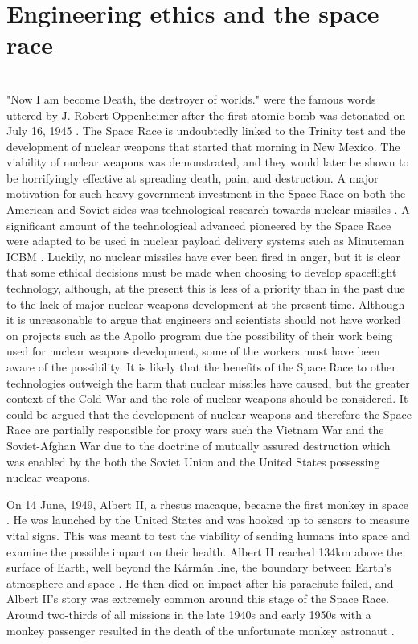 \documentclass[10pt, journal]{IEEEtran}
\begin{document}
\section{Engineering ethics and the space race}
~\\
"Now I am become Death, the destroyer of worlds." were the famous words uttered by J. Robert Oppenheimer after the first atomic bomb was detonated on July 16, 1945 \cite{oppenheimerQuote}. The Space Race is undoubtedly linked to the Trinity test and the development of nuclear weapons that started that morning in New Mexico. The viability of nuclear weapons was demonstrated, and they would later be shown to be horrifyingly effective at spreading death, pain, and destruction. A major motivation for such heavy government investment in the Space Race on both the American and Soviet sides was technological research towards nuclear missiles\cite{bacon} \cite{neufeld}. A significant amount of the technological advanced pioneered by the Space Race were adapted to be used in nuclear payload delivery systems such as Minuteman ICBM \cite{grumman}. Luckily, no nuclear missiles have ever been fired in anger, but it is clear that some ethical decisions must be made when choosing to develop spaceflight technology, although, at the present this is less of a priority than in the past due to the lack of major nuclear weapons development at the present time. Although it is unreasonable to argue that engineers and scientists should not have worked on projects such as the Apollo program due the possibility of their work being used for nuclear weapons development, some of the workers must have been aware of the possibility. It is likely that the benefits of the Space Race to other technologies outweigh the harm that nuclear missiles have caused, but the greater context of the Cold War and the role of nuclear weapons should be considered. It could be argued that the development of nuclear weapons and therefore the Space Race are partially responsible for proxy wars such the Vietnam War and the Soviet-Afghan War due to the doctrine of mutually assured destruction \cite{hughes} which was enabled by the both the Soviet Union and the United States possessing nuclear weapons.

On 14 June, 1949, Albert II, a rhesus macaque, became the first monkey in space \cite{albert}. He was launched by the United States and was hooked up to sensors to measure vital signs. This was meant to test the viability of sending humans into space and examine the possible impact on their health. Albert II reached 134km above the surface of Earth, well beyond the K\'arm\'an line, the boundary between Earth's atmosphere and space \cite{karman}. He then died on impact after his parachute failed, and Albert II's story was extremely common around this stage of the Space Race. Around two-thirds of all missions in the late 1940s and early 1950s with a monkey passenger resulted in the death of the unfortunate monkey astronaut \cite{albert}. 
\end{document}
